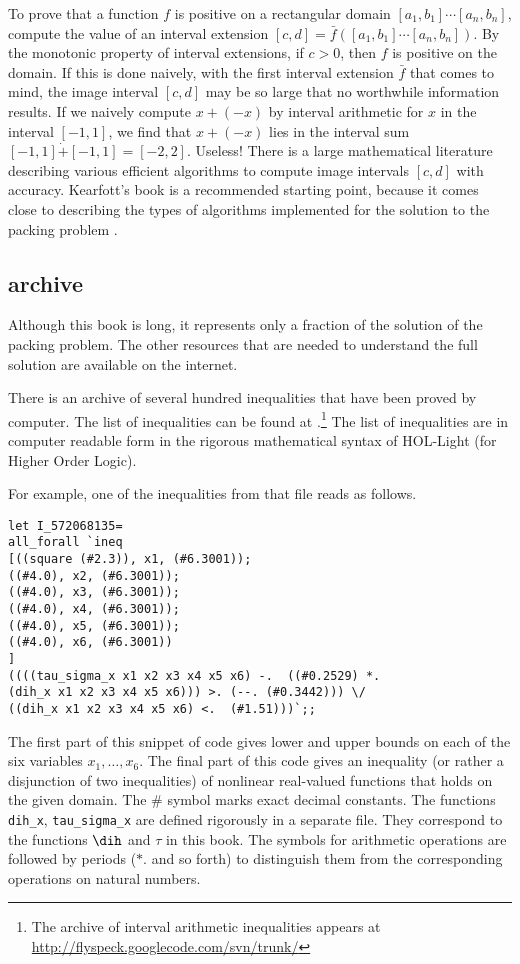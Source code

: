To prove that a function $f$ is positive on a rectangular domain
$[a_1,b_1]\cdots[a_n,b_n]$, compute the
value of an interval extension $[c,d]=\bar f([a_1,b_1]\cdots[a_n,b_n])$.
By the monotonic property of interval extensions, if $c>0$, then $f$
is positive on the domain.  If this is done naively, with the
first interval extension $\bar f$ that comes to mind, the image interval
$[c,d]$ may be so large that no worthwhile information results.
If we naively 
compute $x+(-x)$ by interval arithmetic for $x$ in the interval $[-1,1]$,
we find that $x+(-x)$ lies in the interval sum
$[-1,1]\dot + [-1,1] = [-2,2]$.  Useless!
There is a large mathematical literature describing various 
efficient algorithms
to compute image intervals $[c,d]$ with accuracy.
Kearfott's book is a recommended starting point, because it comes
close to describing the types of algorithms implemented for the
solution to the packing problem \cite{Kea96}. 



\subsection{archive}

Although this book is long, it represents only a fraction of the
solution of the packing problem.  The other resources that are needed
to understand the full solution are available on the internet.

There is an archive of several hundred inequalities that have been
proved by computer.  The list of inequalities can be found at
\cite{web}.\footnote{The archive of interval arithmetic inequalities
  appears at \url{http://flyspeck.googlecode.com/svn/trunk/}} The list
of inequalities are in computer readable form in the rigorous
mathematical syntax of HOL-Light (for Higher Order Logic).

For example, one of the inequalities from that file reads as follows.
\begin{verbatim}
let I_572068135=
all_forall `ineq 
[((square (#2.3)), x1, (#6.3001));
((#4.0), x2, (#6.3001));
((#4.0), x3, (#6.3001));
((#4.0), x4, (#6.3001));
((#4.0), x5, (#6.3001));
((#4.0), x6, (#6.3001))
]
((((tau_sigma_x x1 x2 x3 x4 x5 x6) -.  ((#0.2529) *.  
(dih_x x1 x2 x3 x4 x5 x6))) >. (--. (#0.3442))) \/ 
((dih_x x1 x2 x3 x4 x5 x6) <.  (#1.51)))`;;
\end{verbatim}
The first part of this snippet of code gives lower and upper bounds on
each of the six variables $x_1,\ldots,x_6$.  The final part of this
code gives an inequality (or rather a disjunction of two inequalities)
of nonlinear real-valued functions that holds on the given domain.
The $\#$ symbol marks exact decimal constants.  The functions {\tt
  dih\_x}, {\tt tau\_sigma\_x} are defined rigorously in a separate
file.  They correspond to the functions $\dih$ and $\tau$ in this
book.  The symbols for arithmetic operations are followed by periods
($*.$ and so forth) to distinguish them from the corresponding
operations on natural numbers.

